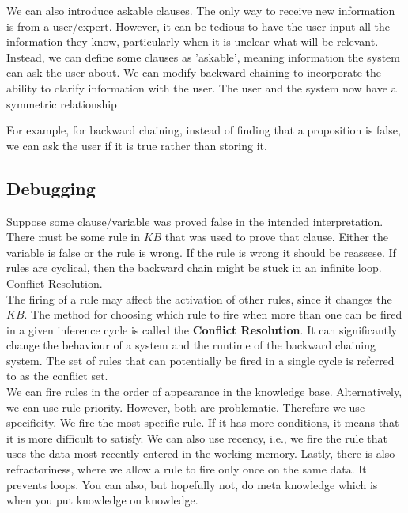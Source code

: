 \documentclass[a4paper]{article}
\theoremstyle{plain}
\theoremstyle{definition}
\newtheorem{defn}{Definition}[section]
\theoremstyle{remark}
\begin{document}
	\begin{tcolorbox}[colback=black!3!white,colframe=black!60!white,title=\begin{defn}Ask-The-User \label{Ask-The-User}\end{defn}]
	We can also introduce askable clauses. The only way to receive new information is from a user/expert. However, it can be tedious to have the user input all the information they know, particularly when it is unclear what will be relevant. Instead, we can define some clauses as 'askable', meaning information the system can ask the user about. We can modify backward chaining to incorporate the ability to clarify information with the user. The user and the system now have a symmetric relationship
	\end{tcolorbox}
	For example, for backward chaining, instead of finding that a proposition is false, we can ask the user if it is true rather than storing it.
	\subsection{Debugging}
	Suppose some clause/variable was proved false in the intended interpretation. There must be some rule in $KB$ that was used to prove that clause. Either the variable is false or the rule is wrong. If the rule is wrong it should be reassese. If rules are cyclical, then the backward chain might be stuck in an infinite loop.\\
	Conflict Resolution.\\
	The firing of a rule may affect the activation of other rules, since it changes the $KB$. The method for choosing which rule to fire when more than one can be fired in a given inference cycle is called the \textbf{Conflict Resolution}. It can significantly change the behaviour of a system and the runtime of the backward chaining system. The set of rules that can potentially be fired in a single cycle is referred to as the conflict set. \\
	We can fire rules in the order of appearance in the knowledge base. Alternatively, we can use rule priority. However, both are problematic. Therefore we use specificity. We fire the most specific rule. If it has more conditions, it means that it is more difficult to satisfy. We can also use recency, i.e., we fire the rule that uses the data most recently entered in the working memory. Lastly, there is also refractoriness, where we allow a rule to fire only once on the same data. It prevents loops. You can also, but hopefully not, do meta knowledge which is when you put knowledge on knowledge.
\end{document}
